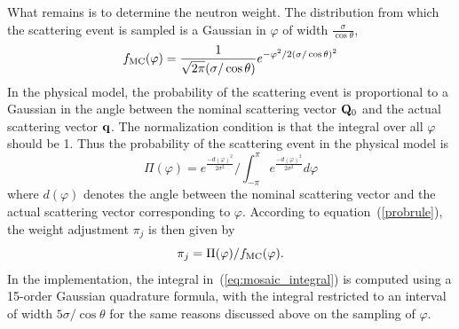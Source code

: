 What remains is to determine the neutron weight. The distribution from
which the scattering event is sampled is a Gaussian in $\varphi$ of
width $\frac{\sigma}{\cos\theta}$,
$$ f_{\rm MC}(\varphi) = \frac{1}{\sqrt{2\pi}(\sigma/\cos\theta)}
            e^{-\varphi^2/2(\sigma/\cos\theta)^2}
$$
In the physical model, the probability of the scattering event is
proportional to a Gaussian in the angle between the nominal scattering
vector ${\bf Q}_0$ and the actual scattering vector ${\bf q}$. The
normalization condition is that the integral over all $\varphi$ should
be 1. Thus the probability of the scattering event in the physical model
is
\begin{equation}
  \label{eq:mosaic_integral}
  \Pi(\varphi) = e^{\frac{-d(\varphi)^2}{2\sigma^2}} /
   \int_{-\pi}^{\pi} e^{\frac{-d(\varphi)^2}{2\sigma^2}} d\varphi
\end{equation}
where $d(\varphi)$ denotes the angle between the nominal scattering
vector and the actual scattering vector corresponding to $\varphi$.
According to equation~(\ref{probrule}), the weight adjustment $\pi_j$ is
then given by
$$ \pi_j = \Pi(\varphi) / f_{\rm MC}(\varphi). $$
In the implementation, the integral in~(\ref{eq:mosaic_integral}) is computed
using a 15-order Gaussian quadrature formula, with the integral
restricted to an interval of width $5\sigma/\cos\theta$ for the same
reasons discussed above on the sampling of $\varphi$.
